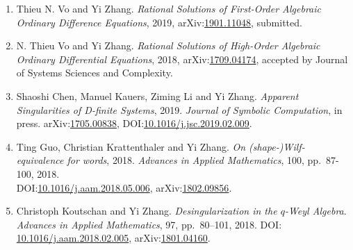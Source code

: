 \documentclass[a4paper,12pt]{article}
\begin{document}
\begin{enumerate}
 \item Thieu N. Vo and Yi Zhang. 
{\em Rational Solutions of First-Order Algebraic Ordinary Difference Equations}, 2019, 
arXiv:\href{http://arxiv.org/abs/1901.11048}{1901.11048}, submitted.
 \item N. Thieu Vo and Yi Zhang. {\em Rational Solutions of High-Order Algebraic Ordinary Differential Equations}, 2018, 
 arXiv:\href{https://arxiv.org/abs/1709.04174}{1709.04174}, accepted by Journal of Systems Sciences and Complexity.
  \item Shaoshi Chen, Manuel Kauers, Ziming Li and Yi Zhang. {\em Apparent Singularities of D-finite Systems}, 2019. 
 {\em  Journal of Symbolic Computation}, in press. arXiv:\href{http://arxiv.org/abs/1705.00838}{1705.00838},  
 DOI:\href{https://doi.org/10.1016/j.jsc.2019.02.009}{10.1016/j.jsc.2019.02.009}.
\item Ting Guo, Christian Krattenthaler and Yi Zhang.
{\em On (shape-)Wilf-equivalence for words}, 2018.
{\em  Advances in Applied Mathematics}, 100, pp.\ 87-100, 2018. \\
DOI:\href{https://doi.org/10.1016/j.aam.2018.05.006}{10.1016/j.aam.2018.05.006}, 
arXiv:\href{https://arxiv.org/pdf/1802.09856.pdf}{1802.09856}.
\item Christoph Koutschan and Yi Zhang. {\em Desingularization in the $q$-Weyl Algebra}. 
{\em Advances in Applied Mathematics}, 97, pp.\ 80–101, 2018. 
DOI: \href{http://dx.doi.org/10.1016/j.aam.2018.02.005}{10.1016/j.aam.2018.02.005},
arXiv:\href{https://arxiv.org/abs/1801.04160}{1801.04160}.   

\end{enumerate}
\end{document}
